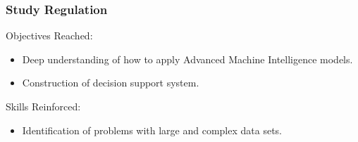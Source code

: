 \begin{frame}
  \frametitle{Study Regulation}
	Objectives Reached:
       \begin{itemize}
    	\item Deep understanding of how to apply Advanced Machine Intelligence models.
        \item Construction of decision support system.
  	   \end{itemize}
    Skills Reinforced:
       \begin{itemize}
    	\item Identification of problems with large and complex data sets.
  	   \end{itemize}



  
\end{frame}


